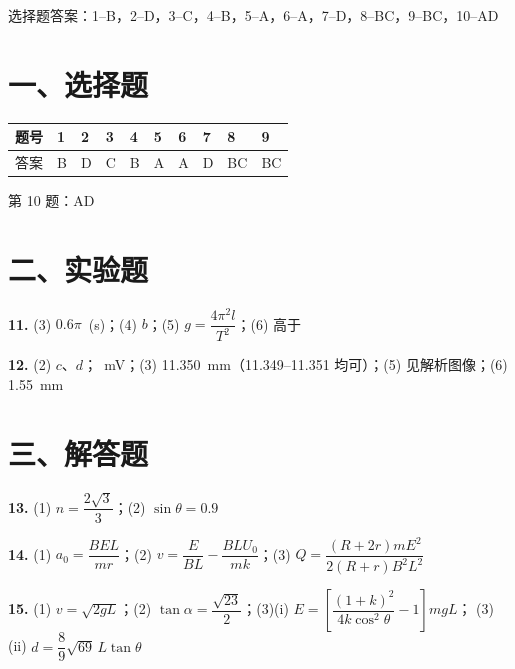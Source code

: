 
\begin{gknotice}
  选择题答案：1--B，2--D，3--C，4--B，5--A，6--A，7--D，8--BC，9--BC，10--AD
\end{gknotice}

\section*{一、选择题}

\noindent
\begin{tabular}{@{}llllllllll@{}}
\toprule
题号 & 1 & 2 & 3 & 4 & 5 & 6 & 7 & 8 & 9\\
\midrule
答案 & B & D & C & B & A & A & D & BC & BC\\
\bottomrule
\end{tabular}

\smallskip

\noindent
第 10 题：AD

\section*{二、实验题}

\noindent
\textbf{11.} (3) $0.6\pi$~(s)；\quad(4) $b$；\quad(5) $g=\dfrac{4\pi^{2}l}{T^{2}}$；\quad(6) 高于

\smallskip

\noindent
\textbf{12.} (2) $c$、$d$；~mV；\quad(3) 11.350~mm（11.349--11.351 均可）；\quad(5) 见解析图像；\quad(6) 1.55~mm

\section*{三、解答题}

\noindent
\textbf{13.} (1) $n=\dfrac{2\sqrt{3}}{3}$；\quad(2) $\sin\theta=0.9$

\smallskip

\noindent
\textbf{14.} (1) $a_{0}=\dfrac{BEL}{mr}$；\quad(2) $v=\dfrac{E}{BL}-\dfrac{BLU_{0}}{mk}$；\quad(3) $Q=\dfrac{(R+2r)mE^{2}}{2(R+r)B^{2}L^{2}}$

\smallskip

\noindent
\textbf{15.} (1) $v=\sqrt{2gL}$；\quad(2) $\tan\alpha=\dfrac{\sqrt{23}}{2}$；\quad(3)(i) $E=\left[\dfrac{(1+k)^{2}}{4k\cos^{2}\theta}-1\right]mgL$；
\qquad(3)(ii) $d=\dfrac{8}{9}\sqrt{69}\,L\tan\theta$
